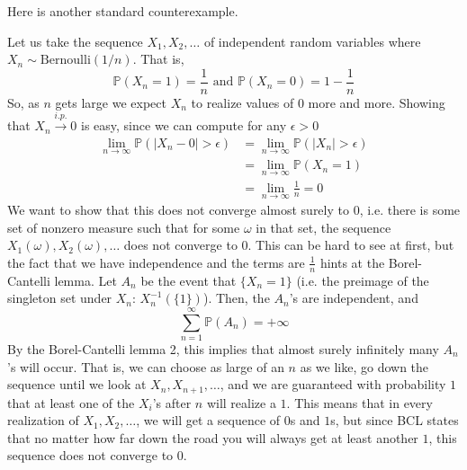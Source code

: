 \documentclass{article}
\begin{document}
      Here is another standard counterexample. 

      \begin{example}
        Let us take the sequence $X_1, X_2, \ldots$ of independent random variables where $X_n \sim \mathrm{Bernoulli}(1/n)$. That is, 
        \begin{equation}
          \mathbb{P}(X_n = 1) = \frac{1}{n} \text{ and } \mathbb{P}(X_n = 0) = 1 - \frac{1}{n}
        \end{equation}
        So, as $n$ gets large we expect $X_n$ to realize values of $0$ more and more. Showing that $X_n \xrightarrow{i.p.} 0$ is easy, since we can compute for any $\epsilon > 0$
        \begin{align*}
          \lim_{n \rightarrow \infty} \mathbb{P}(|X_n - 0| > \epsilon) & = \lim_{n \rightarrow \infty} \mathbb{P}(|X_n| > \epsilon) \\
          & = \lim_{n \rightarrow \infty} \mathbb{P}(X_n = 1) \\
          & = \lim_{n \rightarrow \infty} \frac{1}{n} = 0
        \end{align*}
        We want to show that this does not converge almost surely to $0$, i.e. there is some set of nonzero measure such that for some $\omega$ in that set, the sequence $X_1 (\omega), X_2(\omega), \ldots$ does not converge to $0$. This can be hard to see at first, but the fact that we have independence and the terms are $\frac{1}{n}$ hints at the Borel-Cantelli lemma. Let $A_n$ be the event that $\{X_n = 1\}$ (i.e. the preimage of the singleton set under $X_n$: $X_n^{-1} ( \{1\})$). Then, the $A_n$'s are independent, and 
        \begin{equation}
          \sum_{n=1}^\infty \mathbb{P}(A_n) = +\infty
        \end{equation}
        By the Borel-Cantelli lemma 2, this implies that almost surely infinitely many $A_n$'s will occur. That is, we can choose as large of an $n$ as we like, go down the sequence until we look at $X_n, X_{n+1}, \ldots$, and we are guaranteed with probability $1$ that at least one of the $X_i$'s after $n$ will realize a $1$. This means that in every realization of $X_1, X_2, \ldots$, we will get a sequence of $0$s and $1$s, but since BCL states that no matter how far down the road you will always get at least another $1$, this sequence does not converge to $0$.  
      \end{example}
\end{document}

